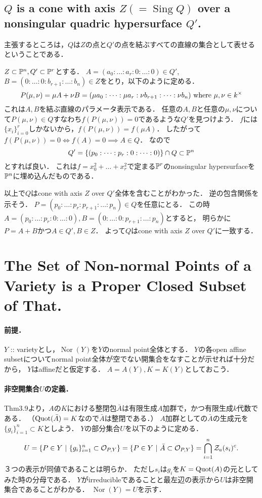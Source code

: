 \documentclass[a4paper]{jsarticle}
\newcommand{\Sing}{\operatorname{Sing}}
\newcommand{\Nor}{\operatorname{Nor}}
\begin{document}
    \subsection{$Q$ is a cone with axis $Z (=\Sing Q)$ over a nonsingular quadric hypersurface $Q'$.}
    主張するところは，$Q$は$Z$の点と$Q'$の点を結ぶすべての直線の集合として表せるということである．

    $Z \subset \mathbb{P}^n, Q' \subset \mathbb{P}^r$とする．
    $A=(a_0:\dots:a_r:0:\dots:0) \in Q'$, $B=(0:\dots:0:b_{r+1}:\dots:b_n) \in Z$をとり，以下のように定める．
    \[ P(\mu,\nu)=\mu A+\nu B=(\mu a_0:\dots:\mu a_r:\nu b_{r+1}:\dots:\nu b_{n}) \text{ where } \mu, \nu \in k^{\times} \]
    これは$A, B$を結ぶ直線のパラメータ表示である．
    任意の$A,B$と任意の$\mu,\nu$について$P(\mu,\nu) \in Q$すなわち$f(P(\mu,\nu))=0$であるような$Q'$を見つけよう．
    $f$には$\{x_i\}_{i=0}^{r}$しかないから，$f(P(\mu,\nu))=f(\mu A)$．
    したがって$f(P(\mu,\nu))=0 \iff f(A)=0 \implies A \in Q$．
    なので
    \[ Q'=\{ (p_0:\dots:p_r:0:\dots:0) \} \cap Q \subset \mathbb{P}^n \]
    とすれば良い．
    これは$f=x_0^2+\dots+x_r^2$で定まる$\mathbb{P}^r$のnonsingular hypersurfaceを$\mathbb{P}^n$に埋め込んだものである．

    以上で$Q$はcone with axis $Z$ over $Q'$全体を含むことがわかった．
    逆の包含関係を示そう．
    $P=(p_0:\dots:p_r:p_{r+1}:\dots:p_n) \in Q$を任意にとる．
    この時$A=(p_0:\dots:p_r:0:\dots:0), B=(0:\dots:0:p_{r+1}:\dots:p_n)$とすると，
    明らかに$P=A+B$かつ$A \in Q', B \in Z$．
    よって$Q$はcone with axis $Z$ over $Q'$に一致する．

\section{The Set of Non-normal Points of a Variety is a Proper Closed Subset of That.} %
    \paragraph{前提．}
    $Y$ :: varietyとし，$\Nor(Y)$を$Y$のnormal point全体とする．
    $Y$の各open affine subsetについてnormal point全体が空でない開集合をなすことが示せれば十分だから，
    $Y$はaffineだと仮定する．
    $A=A(Y), K=K(Y)$としておこう．

    \paragraph{非空開集合$U$の定義．}
    Thm3.9より，$A$の$K$における整閉包$\bar{A}$は有限生成$A$加群で，かつ有限生成$k$代数である．
    （$\operatorname{Quot}(\bar{A})=K$なので$\bar{A}$は整閉である．）
    $A$加群としての$\bar{A}$の生成元を$\{g_i\}_{i=1}^n \subset K$としよう．
    $Y$の部分集合$U$を以下のように定める．
    \[
        U
        =\{ P \in Y ~|~ \{g_i\}_{i=1}^n \subset \mathcal{O}_{P,Y} \}
        =\{ P \in Y ~|~ \bar{A} \subset \mathcal{O}_{P,Y} \}
        =\bigcap_{i=1}^n \mathcal{Z}_a(s_i)^c.
    \]
    ３つの表示が同値であることは明らか．
    ただし$s_i$は$g_i$を$K=\operatorname{Quot}(A)$の元としてみた時の分母である．
    $Y$がirreducibleであることと最左辺の表示から$U$は非空開集合であることがわかる．
    $\Nor(Y)=U$を示す．
\end{document}
